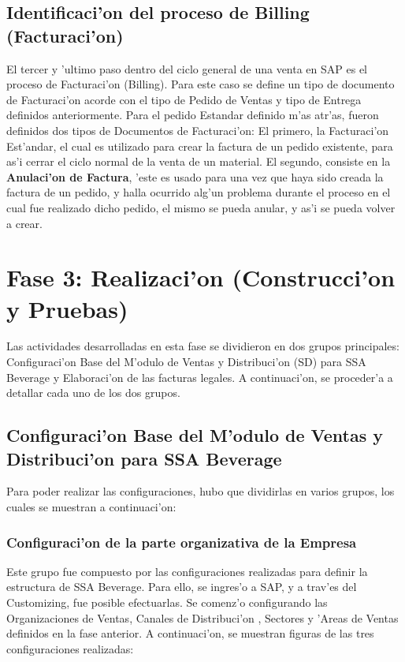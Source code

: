 \subsection{Identificaci'on del proceso de Billing (Facturaci'on)}
	El tercer y 'ultimo paso dentro del ciclo general de una venta en SAP es el proceso de Facturaci'on (Billing). Para este caso se define un tipo de documento de Facturaci'on acorde con el tipo de Pedido de Ventas y tipo de Entrega definidos anteriormente.
	Para el pedido Estandar definido m'as atr'as, fueron definidos dos tipos de Documentos de Facturaci'on: El primero, la Facturaci'on Est'andar, el cual es utilizado para crear la factura de un pedido existente, para as'i cerrar el ciclo normal de la venta de un material. El segundo, consiste en la \textbf{Anulaci'on de Factura}, 'este es usado para una vez que haya sido creada la factura de un pedido, y halla ocurrido alg'un problema durante el proceso en el cual fue realizado dicho pedido, el mismo se pueda anular, y as'i se pueda volver a crear.

\section{Fase 3: Realizaci'on (Construcci'on y Pruebas)}
	Las actividades desarrolladas en esta fase se dividieron en dos grupos principales: Configuraci'on Base del M'odulo de Ventas y Distribuci'on (SD) para SSA Beverage y Elaboraci'on de las facturas legales.
	A continuaci'on, se proceder'a a detallar cada uno de los dos grupos.
\subsection{Configuraci'on Base del M'odulo de Ventas y Distribuci'on para SSA Beverage}
	Para poder realizar las configuraciones, hubo que dividirlas en varios grupos, los cuales se muestran a continuaci'on:
\subsubsection{Configuraci'on de la parte organizativa de la Empresa}
	Este grupo fue compuesto por las configuraciones realizadas para definir la estructura de SSA Beverage. Para ello, se ingres'o a SAP, y a trav'es del Customizing, fue posible efectuarlas. Se comenz'o configurando las Organizaciones de Ventas, Canales de Distribuci'on , Sectores y 'Areas de Ventas definidos en la fase anterior. A continuaci'on, se muestran figuras de las tres configuraciones realizadas:

